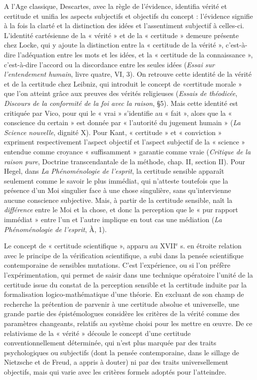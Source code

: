 A l’Age classique, Descartes, avec la
règle de l’évidence, identifia vérité et certitude
et unifia les aspects subjectifs et
objectifs du concept : l’évidence signifie à
la fois la clarté et la distinction des idées
et l’assentiment subjectif à celles-ci.
L'identité cartésienne de la « vérité » et
de la « certitude » demeure présente chez
Locke, qui y ajoute la distinction entre la
« certitude de la vérité », c’est-à-dire
l’adéquation entre les mots et les idées, et
la « certitude de la connaissance », c’est-à-dire
l’accord ou la discordance entre les
seules idées ({\it Essai sur l’entendement
humain}, livre quatre, VI, 3). On retrouve
cette identité de la vérité et de la certitude
chez Leibniz, qui introduit le concept de
«certitude morale » que l’on atteint grâce
aux preuves des vérités religieuses ({\it Essais
de théodicée}, {\it Discours de la conformité de
la foi avec la raison}, \S 5). Mais cette identité
est critiquée par Vico, pour qui le
« vrai » s’identifie au « fait », alors que la
« conscience du certain » est donnée par
« l'autorité du jugement humain » ({\it La
Science nouvelle}, dignité X). Pour Kant,
« certitude » et « conviction » expriment
respectivement l’aspect objectif et l’aspect
subjectif de la « science » entendue
comme croyance « suffisamment » garantie
comme vraie ({\it Critique de la raison
%
pure}, Doctrine transcendantale de la
méthode, chap. II, section II). Pour
Hegel, dans {\it La Phénoménologie de l’esprit},
la certitude sensible apparaît seulement
comme le savoir le plus immédiat,
qui n’atteste toutefois que la présence
d’un Moi singulier face à une chose singulière,
sans qu’intervienne aucune
conscience subjective. Mais, à partir de la
certitude sensible, naît la {\it différence} entre
le Moi et la chose, et donc la perception
que le « pur rapport immédiat » entre l’un
et l’autre implique en tout cas une médiation
({\it La Phénoménologie de l'esprit}, À, 1).

Le concept de « certitude scientifique »,
apparu au {\footnotesize XVII}$^\text{e}$ s. en étroite relation avec le
principe de la vérification scientifique, a
subi dans la pensée scientifique contemporaine
de sensibles mutations. C’est l’expérience,
ou si l’on préfère l’expérimentation,
qui permet de saisir dans une technique
opératoire l’unité de la certitude issue du
constat de la perception sensible et la certitude
induite par la formalisation logico-mathématique
d’une théorie. En excluant
de son champ de recherche la prétention de
parvenir à une certitude absolue et universelle,
une grande partie des épistémologues
considère les critères de la vérité comme
des paramètres changeants, relatifs au système
choisi pour les mettre en œuvre. De
ce relativisme de la « vérité » découle le
concept d’une certitude conventionnellement
déterminée, qui n’est plus marquée
par des traits psychologiques ou subjectifs
(dont la pensée contemporaine, dans le sillage
de Nietzsche et de Freud, a appris à
douter) ni par des traits universellement
objectifs, mais qui varie avec les critères
formels adoptés pour l’atteindre.


 

 

